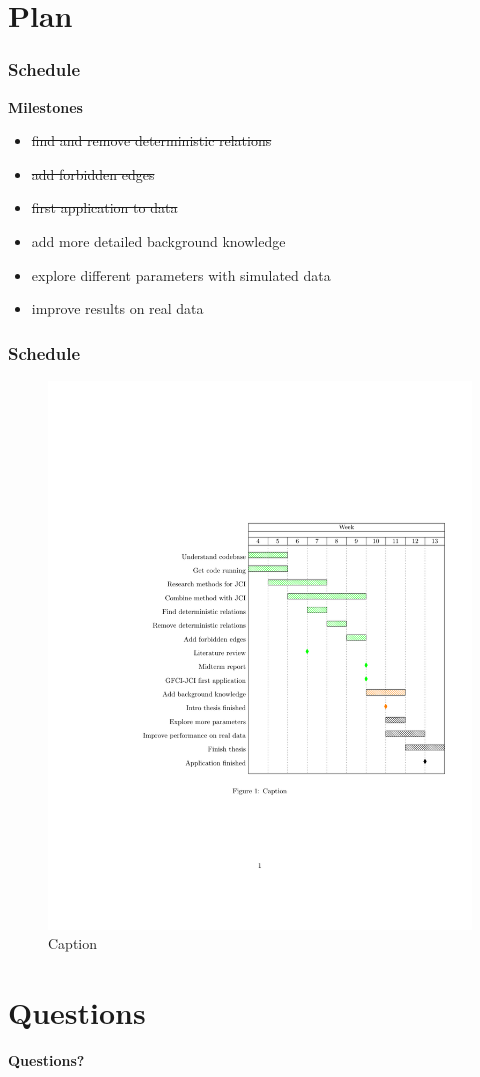 \documentclass[10pt, compress]{beamer}
\begin{document}
\section{Plan}
\begin{frame}
    \frametitle{Schedule}
    \textbf{Milestones}
    \begin{itemize}
        \item \sout{find and remove deterministic relations}
        \item\sout{add forbidden edges}
        \item \sout{first application to data}
        \item add more detailed background knowledge
        \item explore different parameters with simulated data
        \item improve results on real data
    \end{itemize}
    
\end{frame}

\begin{frame}
\frametitle{Schedule}
    \begin{figure}
        \centering
        \includegraphics[width=\textwidth]{gantt.pdf}
        \caption{Caption}
        \label{fig:my_label}
    \end{figure}
\end{frame}

\section{Questions}
\begin{frame}{}
\begin{center}
\Huge \textbf{Questions?}
\end{center}
\end{frame}
\end{document}
